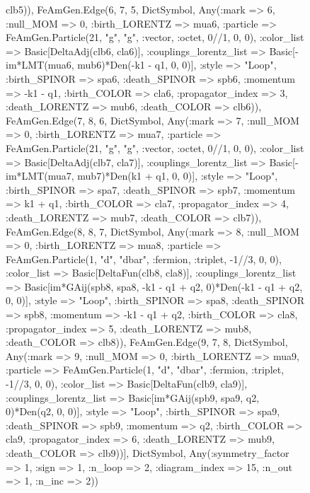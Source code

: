 \documentclass{revtex4}
\begin{document}
\begin{figure}[!htb]
\begin{center}
{clb5)), FeAmGen.Edge(6, 7, 5, Dict{Symbol, Any}(:mark => 6, :null_MOM => 0, :birth_LORENTZ => mua6, :particle => FeAmGen.Particle(21, "g", "g", :vector, :octet, 0//1, 0, 0), :color_list => Basic[DeltaAdj(clb6, cla6)], :couplings_lorentz_list => Basic[-im*LMT(mua6, mub6)*Den(-k1 - q1, 0, 0)], :style => "Loop", :birth_SPINOR => spa6, :death_SPINOR => spb6, :momentum => -k1 - q1, :birth_COLOR => cla6, :propagator_index => 3, :death_LORENTZ => mub6, :death_COLOR => clb6)), FeAmGen.Edge(7, 8, 6, Dict{Symbol, Any}(:mark => 7, :null_MOM => 0, :birth_LORENTZ => mua7, :particle => FeAmGen.Particle(21, "g", "g", :vector, :octet, 0//1, 0, 0), :color_list => Basic[DeltaAdj(clb7, cla7)], :couplings_lorentz_list => Basic[-im*LMT(mua7, mub7)*Den(k1 + q1, 0, 0)], :style => "Loop", :birth_SPINOR => spa7, :death_SPINOR => spb7, :momentum => k1 + q1, :birth_COLOR => cla7, :propagator_index => 4, :death_LORENTZ => mub7, :death_COLOR => clb7)), FeAmGen.Edge(8, 8, 7, Dict{Symbol, Any}(:mark => 8, :null_MOM => 0, :birth_LORENTZ => mua8, :particle => FeAmGen.Particle(1, "d", "dbar", :fermion, :triplet, -1//3, 0, 0), :color_list => Basic[DeltaFun(clb8, cla8)], :couplings_lorentz_list => Basic[im*GAij(spb8, spa8, -k1 - q1 + q2, 0)*Den(-k1 - q1 + q2, 0, 0)], :style => "Loop", :birth_SPINOR => spa8, :death_SPINOR => spb8, :momentum => -k1 - q1 + q2, :birth_COLOR => cla8, :propagator_index => 5, :death_LORENTZ => mub8, :death_COLOR => clb8)), FeAmGen.Edge(9, 7, 8, Dict{Symbol, Any}(:mark => 9, :null_MOM => 0, :birth_LORENTZ => mua9, :particle => FeAmGen.Particle(1, "d", "dbar", :fermion, :triplet, -1//3, 0, 0), :color_list => Basic[DeltaFun(clb9, cla9)], :couplings_lorentz_list => Basic[im*GAij(spb9, spa9, q2, 0)*Den(q2, 0, 0)], :style => "Loop", :birth_SPINOR => spa9, :death_SPINOR => spb9, :momentum => q2, :birth_COLOR => cla9, :propagator_index => 6, :death_LORENTZ => mub9, :death_COLOR => clb9))], Dict{Symbol, Any}(:symmetry_factor => 1, :sign => 1, :n_loop => 2, :diagram_index => 15, :n_out => 1, :n_inc => 2)) 
}
\end{center}
\end{figure}
\end{document}
